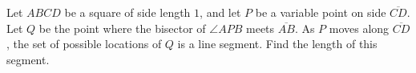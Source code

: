 Let $ABCD$ be a square of side length $1$, and let $P$ be a variable point on side $\overline{CD}$. Let $Q$ be the point where the bisector of $\angle APB$ meets $\overline{AB}$. As $P$ moves along $\overline{CD}$, the set of possible locations of $Q$ is a line segment. Find the length of this segment.
